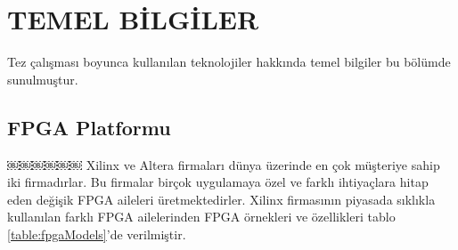 \chapter{TEMEL BİLGİLER} \label{chapter:temelBilgiler}
Tez çalışması boyunca kullanılan teknolojiler hakkında temel bilgiler bu bölümde sunulmuştur.
\section{FPGA Platformu}
￼￼￼￼￼￼
Xilinx ve Altera firmaları dünya üzerinde en çok müşteriye sahip iki firmadırlar. Bu firmalar birçok uygulamaya özel ve farklı ihtiyaçlara hitap eden değişik FPGA aileleri üretmektedirler. Xilinx firmasının piyasada sıklıkla kullanılan farklı FPGA ailelerinden FPGA örnekleri ve özellikleri tablo \ref{table:fpgaModels}’de verilmiştir.
